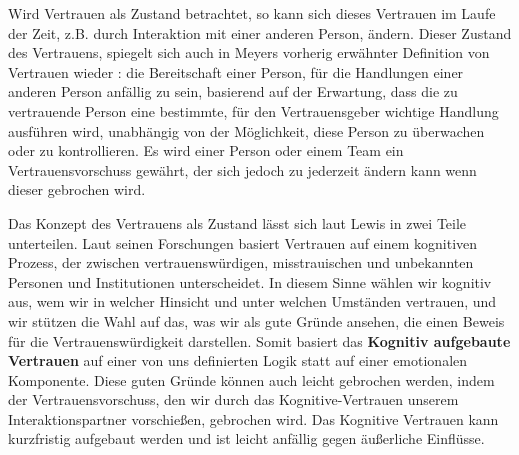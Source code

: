 \documentclass[a4paper,11pt]{article}%
\renewcommand{\\}{\vspace*{0.5\baselineskip} \newline}
\begin{document}
Wird Vertrauen als \dq Zustand\dq{} betrachtet, so kann sich dieses Vertrauen im Laufe der Zeit, z.B. durch Interaktion mit einer anderen Person, ändern. Dieser \dq Zustand\dq{} des Vertrauens, spiegelt sich auch in Meyers \citep[p.712]{mayer1995integrative} vorherig erwähnter Definition von Vertrauen wieder :\\ \dq die Bereitschaft einer Person, für die Handlungen einer anderen Person anfällig zu sein, basierend auf der Erwartung, dass die zu vertrauende Person eine bestimmte, für den Vertrauensgeber wichtige Handlung ausführen wird, unabhängig von der Möglichkeit, diese Person zu überwachen oder zu kontrollieren.\dq{} \\
Es wird einer Person oder einem Team ein Vertrauensvorschuss gewährt, der sich jedoch zu jederzeit ändern kann wenn dieser gebrochen wird.


Das Konzept des Vertrauens als Zustand lässt sich laut Lewis \citep[p.970-971]{lewis1985trust} in zwei Teile unterteilen.\newline
Laut seinen Forschungen basiert Vertrauen \dq auf einem kognitiven Prozess, der zwischen vertrauenswürdigen, misstrauischen und unbekannten Personen und Institutionen unterscheidet. In diesem Sinne wählen wir kognitiv aus, wem wir in welcher Hinsicht und unter welchen Umständen vertrauen, und wir stützen die Wahl auf das, was wir als \dq gute Gründe\dq{} ansehen, die einen Beweis für die Vertrauenswürdigkeit darstellen.\dq{}\citep[p.970]{lewis1985trust}
Somit basiert das \textbf{Kognitiv aufgebaute Vertrauen} auf einer von uns definierten Logik statt auf einer emotionalen Komponente. Diese \dq guten Gründe\dq{} können auch leicht gebrochen werden, indem der Vertrauensvorschuss, den wir durch das Kognitive-Vertrauen unserem Interaktionspartner vorschießen, gebrochen wird.
Das Kognitive Vertrauen kann kurzfristig aufgebaut werden und ist leicht anfällig gegen äußerliche Einflüsse. 
\end{document}
